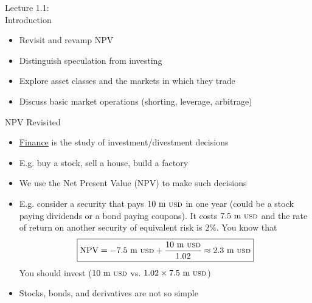 \documentclass{beamer}
\begin{document}
\begin{frame}
\begin{center}
\Huge Lecture 1.1: \\
Introduction
\end{center}
\end{frame}

\begin{frame}{}
	\begin{itemize}
		\item Revisit and revamp NPV
		\item Distinguish speculation from investing
		\item Explore asset classes and the markets in which they trade
		\item Discuss basic market operations (shorting, leverage, arbitrage)
	\end{itemize}
\end{frame}

\begin{frame}
\begin{center}
\Huge NPV Revisited
\end{center}
\end{frame}

\begin{frame}{}
	\begin{itemize}
		\item \underline{Finance} is the study of investment/divestment decisions
		\item E.g. buy a stock, sell a house, build a factory
		\item We use the Net Present Value (NPV) to make such decisions 
		\item E.g. consider a security that pays $10\text{ m {\scriptsize USD}}$ in one year (could be a stock paying dividends or a bond paying coupons). It costs $7.5\text{ m {\scriptsize USD}}$ and the rate of return on another security of equivalent risk is $2\%$. You know that 
		\begin{equation}
			\boxed{
			\text{NPV}=-7.5\text{ m {\scriptsize USD}}+\frac{10\text{ m {\scriptsize USD}}}{1.02}\approx 2.3\text{ m {\scriptsize USD}}
			}
		\end{equation}
		You should invest ($10\text{ m {\scriptsize USD}}$ vs. $1.02\times7.5\text{ m {\scriptsize USD}}$) 
		\item Stocks, bonds, and derivatives are not so simple
	\end{itemize}
\end{frame}
\end{document}
